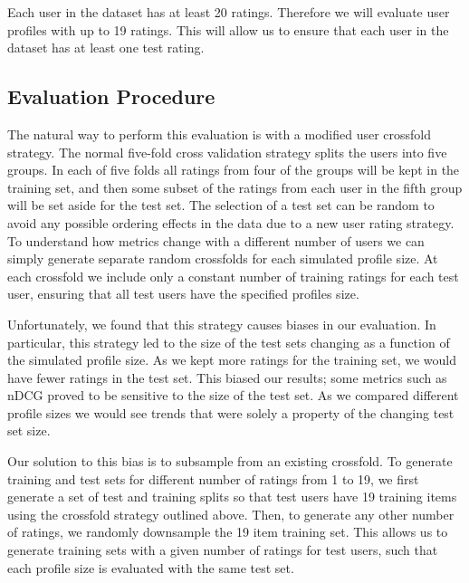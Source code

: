\documentclass[letterpaper]{sig-alternate}
\begin{document}
  Each user in the dataset has at least 20 ratings.
  Therefore we will evaluate user profiles with up to 19 ratings.
  This will allow us to ensure that each user in the dataset has at least one test rating.

  
  \subsection*{Evaluation Procedure}

  The natural way to perform this evaluation is with a modified user crossfold strategy.
  The normal five-fold cross validation strategy splits the users into five groups.
  In each of five folds all ratings from four of the groups will be kept in the training set, and then some subset of the ratings from each user in the fifth group will be set aside for the test set.
  The selection of a test set can be random to avoid any possible ordering effects in the data due to a new user rating strategy.
  To understand how metrics change with a different number of users we can simply generate separate random crossfolds for each simulated profile size.
  At each crossfold we include only a constant number of training ratings for each test user, ensuring that all test users have the specified profiles size.
  
  Unfortunately, we found that this strategy causes biases in our evaluation.
  In particular, this strategy led to the size of the test sets changing as a function of the simulated profile size.
  As we kept more ratings for the training set, we would have fewer ratings in the test set.
  This biased our results; some metrics such as nDCG proved to be sensitive to the size of the test set.
  As we compared different profile sizes we would see trends that were solely a property of the changing test set size.
  
  Our solution to this bias is to subsample from an existing crossfold.
  To generate training and test sets for different number of ratings from 1 to 19, we first generate a set of test and training splits so that test users have 19 training items using the crossfold strategy outlined above.
  Then, to generate any other number of ratings, we randomly downsample the 19 item training set.
  This allows us to generate training sets with a given number of ratings for test users, such that each profile size is evaluated with the same test set.
\end{document}
